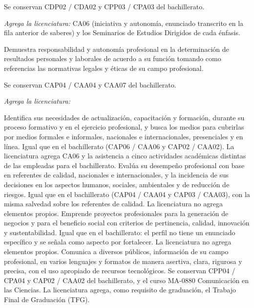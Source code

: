 \documentclass[11pt,a4paper]{article}
\begin{document}
{Se conservan CDP02 / CDA02 y CPP03 / CPA03 del bachillerato.\par
 \textit{Agrega la licenciatura:} CA06 (iniciativa y autonomía, enunciado transcrito en la fila anterior de saberes) y los Seminarios de Estudios Dirigidos de cada énfasis.}
{Demuestra responsabilidad y autonomía profesional en la determinación de resultados personales y laborales de acuerdo a su función tomando como referencias las normativas legales y éticas de su campo profesional.}
{Se conservan CAP04 / CAA04 y CAA07 del bachillerato.\par
 \textit{Agrega la licenciatura:}\par
 }
{Identifica sus necesidades de actualización, capacitación y formación, durante su proceso formativo y en el ejercicio profesional, y busca los medios para cubrirlas por medios formales e informales, nacionales e internacionales, presenciales y en línea.}
{Igual que en el bachillerato (CAP06 / CAA06 y CAP02 / CAA02). La licenciatura agrega CA06 y la asistencia a cinco actividades académicas distintas de las empleadas para el bachillerato.}
{Evalúa su desempeño profesional con base en referentes de calidad, nacionales e internacionales, y la incidencia de sus decisiones en los aspectos humanos, sociales, ambientales y de reducción de riesgos.}
{Igual que en el bachillerato (CAP04 / CAA04 y CAP03 / CAA03), con la misma salvedad sobre los referentes de calidad. La licenciatura no agrega elementos propios.}
{Emprende proyectos profesionales para la generación de negocios y para el beneficio social con criterios de pertinencia, calidad, innovación y sustentabilidad.}
{Igual que en el bachillerato: el perfil no tiene un enunciado específico y se señala como aspecto por fortalecer. La licenciatura no agrega elementos propios.}
{Comunica a diversos públicos, información de su campo profesional, en varios lenguajes y formatos de manera asertiva, clara, rigurosa y precisa, con el uso apropiado de recursos tecnológicos.}
{Se conservan CPP04 / CPA04 y CAP02 / CAA02 del bachillerato, y el curso MA-0880 Comunicación en las Ciencias. La licenciatura agrega, como requisito de graduación, el Trabajo Final de Graduación (TFG).}
\end{document}
